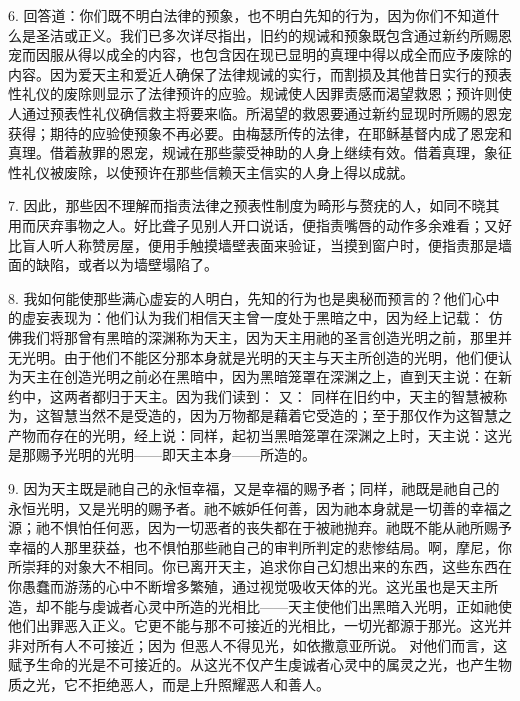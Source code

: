 6.  回答道：你们既不明白法律的预象，也不明白先知的行为，因为你们不知道什么是圣洁或正义。我们已多次详尽指出，旧约的规诫和预象既包含通过新约所赐恩宠而因服从得以成全的内容，也包含因在现已显明的真理中得以成全而应予废除的内容。因为爱天主和爱近人确保了法律规诫的实行，而割损及其他昔日实行的预表性礼仪的废除则显示了法律预许的应验。规诫使人因罪责感而渴望救恩；预许则使人通过预表性礼仪确信救主将要来临。所渴望的救恩要通过新约显现时所赐的恩宠获得；期待的应验使预象不再必要。由梅瑟所传的法律，在耶稣基督内成了恩宠和真理。借着赦罪的恩宠，规诫在那些蒙受神助的人身上继续有效。借着真理，象征性礼仪被废除，以使预许在那些信赖天主信实的人身上得以成就。\par

7. 因此，那些因不理解而指责法律之预表性制度为畸形与赘疣的人，如同不晓其用而厌弃事物之人。好比聋子见别人开口说话，便指责嘴唇的动作多余难看；又好比盲人听人称赞房屋，便用手触摸墙壁表面来验证，当摸到窗户时，便指责那是墙面的缺陷，或者以为墙壁塌陷了。\par

8. 我如何能使那些满心虚妄的人明白，先知的行为也是奥秘而预言的？他们心中的虚妄表现为：他们认为我们相信天主曾一度处于黑暗之中，因为经上记载： 仿佛我们将那曾有黑暗的深渊称为天主，因为天主用祂的圣言创造光明之前，那里并无光明。由于他们不能区分那本身就是光明的天主与天主所创造的光明，他们便认为天主在创造光明之前必在黑暗中，因为黑暗笼罩在深渊之上，直到天主说：在新约中，这两者都归于天主。因为我们读到： 又： 同样在旧约中，天主的智慧被称为，这智慧当然不是受造的，因为万物都是藉着它受造的；至于那仅作为这智慧之产物而存在的光明，经上说：同样，起初当黑暗笼罩在深渊之上时，天主说：这光是那赐予光明的光明——即天主本身——所造的。\par

9. 因为天主既是祂自己的永恒幸福，又是幸福的赐予者；同样，祂既是祂自己的永恒光明，又是光明的赐予者。祂不嫉妒任何善，因为祂本身就是一切善的幸福之源；祂不惧怕任何恶，因为一切恶者的丧失都在于被祂抛弃。祂既不能从祂所赐予幸福的人那里获益，也不惧怕那些祂自己的审判所判定的悲惨结局。啊，摩尼，你所崇拜的对象大不相同。你已离开天主，追求你自己幻想出来的东西，这些东西在你愚蠢而游荡的心中不断增多繁殖，通过视觉吸收天体的光。这光虽也是天主所造，却不能与虔诚者心灵中所造的光相比——天主使他们出黑暗入光明，正如祂使他们出罪恶入正义。它更不能与那不可接近的光相比，一切光都源于那光。这光并非对所有人不可接近；因为 但恶人不得见光，如依撒意亚所说。 对他们而言，这赋予生命的光是不可接近的。从这光不仅产生虔诚者心灵中的属灵之光，也产生物质之光，它不拒绝恶人，而是上升照耀恶人和善人。\par

